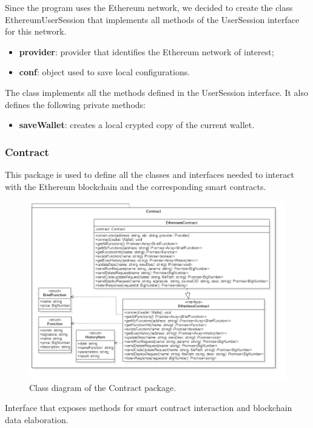 			Since the program uses the Ethereum network, we decided to create the class EthereumUserSession that implements all methods of the UserSession interface for this network.
					\begin{itemize}
						\item \textbf{provider}: provider that identifies the Ethereum network of interest; 
						\item \textbf{conf}: object used to save local configurations.
					\end{itemize}
				
				The class implements all the methods defined in the UserSession interface. It also defines the following private methods: 
					\begin{itemize}
						\item\textbf{saveWallet}: creates a local crypted copy of the current wallet. 
					\end{itemize}
				
		\subsubsection{Contract} 
		This package is used to define all the classes and interfaces needed to interact with the Ethereum blockchain and the corresponding smart contracts. 
		\begin{figure} [h!]
			\centering
			\includegraphics[width=0.75\linewidth]{diagrammi/etherless-cli/Contract}
			\caption{Class diagram of the Contract package.}
		\end{figure}
	
			Interface that exposes methods for smart contract interaction and blockchain data elaboration. 	
			
